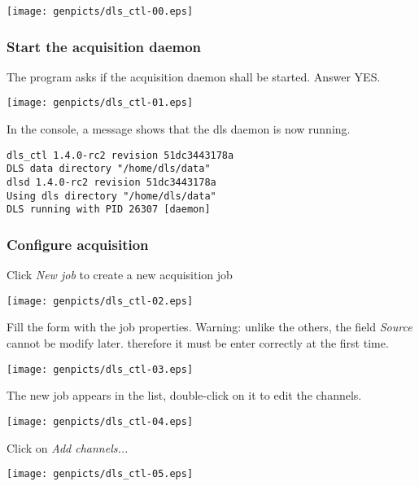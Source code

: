 \begin{center}
\texttt{[image: genpicts/dls\_ctl-00.eps]}
\end{center}

\subsubsection{Start the acquisition daemon}
The program asks if the acquisition daemon
  shall be started. Answer YES.

\begin{center}
\texttt{[image: genpicts/dls\_ctl-01.eps]}
\end{center}

\noindent In the console, a message shows that the dls daemon is now running.

\begin{verbatim}
dls_ctl 1.4.0-rc2 revision 51dc3443178a
DLS data directory "/home/dls/data"
dlsd 1.4.0-rc2 revision 51dc3443178a
Using dls directory "/home/dls/data"
DLS running with PID 26307 [daemon]
\end{verbatim}


\subsubsection{Configure acquisition}

\noindent Click \textit{New job} to create a new acquisition job
\begin{center}
\texttt{[image: genpicts/dls\_ctl-02.eps]}
\end{center}


\noindent Fill the form with the job properties. Warning: unlike the others,
the field \textit{Source} cannot be modify later. therefore it must be
enter correctly at the first time.

\begin{center}
\texttt{[image: genpicts/dls\_ctl-03.eps]}
\end{center}

\noindent The new job appears in the list, double-click on it
to edit the channels.

\begin{center}
\texttt{[image: genpicts/dls\_ctl-04.eps]}
\end{center}

\noindent Click on \textit{Add channels...}
\begin{center}
\texttt{[image: genpicts/dls\_ctl-05.eps]}
\end{center}

